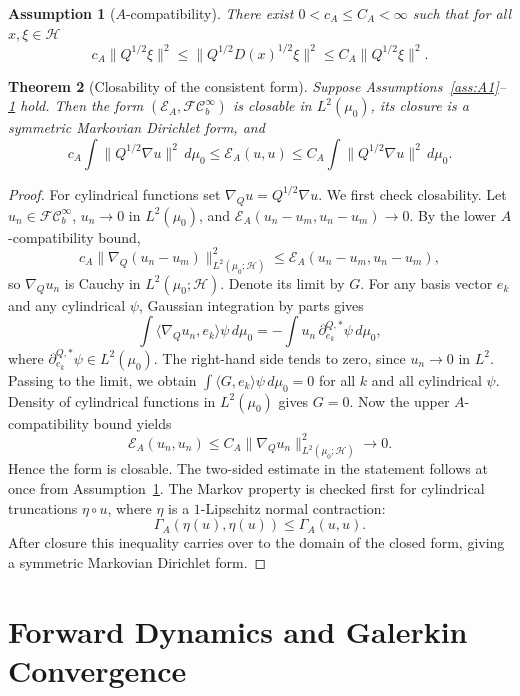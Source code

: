 \documentclass{article}
\newtheorem{theorem}{Theorem}[section]
\newtheorem{assumption}[theorem]{Assumption}
\newcommand{\Hh}{\mathcal H}
\newcommand{\FC}{\mathcal{FC}_b^\infty}
\begin{document}
\begin{assumption}[\(A\)-compatibility]
\label{ass:Acompat}
There exist \(0<c_A\le C_A<\infty\) such that for all \(x,\xi\in\Hh\)
\[
        c_A\|Q^{1/2}\xi\|^2
        \le
        \|Q^{1/2}D(x)^{1/2}\xi\|^2
        \le
        C_A\|Q^{1/2}\xi\|^2 .
\]
\end{assumption}

\begin{theorem}[Closability of the consistent form]
\label{thm:closability}
Suppose Assumptions~\ref{ass:A1}--\ref{ass:Acompat} hold. Then the form
\((\mathcal E_A,\FC)\) is closable in \(L^2(\mu_0)\), its closure is a
symmetric Markovian Dirichlet form, and
\[
        c_A\int\|Q^{1/2}\nabla u\|^2\,d\mu_0
        \le
        \mathcal E_A(u,u)
        \le
        C_A\int\|Q^{1/2}\nabla u\|^2\,d\mu_0 .
\]
\end{theorem}

\begin{proof}
For cylindrical functions set \(\nabla_Q u=Q^{1/2}\nabla u\). We first check
closability. Let \(u_n\in\FC\), \(u_n\to0\) in \(L^2(\mu_0)\), and
\(\mathcal E_A(u_n-u_m,u_n-u_m)\to0\). By the lower \(A\)-compatibility bound,
\[
        c_A\|\nabla_Q(u_n-u_m)\|_{L^2(\mu_0;\Hh)}^2
        \le \mathcal E_A(u_n-u_m,u_n-u_m),
\]
so \(\nabla_Q u_n\) is Cauchy in \(L^2(\mu_0;\Hh)\). Denote its limit by
\(G\). For any basis vector \(e_k\) and any cylindrical \(\psi\), Gaussian
integration by parts gives
\[
        \int \langle \nabla_Q u_n,e_k\rangle \psi\,d\mu_0
        =-\int u_n\,\partial^{Q,*}_{e_k}\psi\,d\mu_0,
\]
where \(\partial^{Q,*}_{e_k}\psi\in L^2(\mu_0)\). The right-hand side tends to
zero, since \(u_n\to0\) in \(L^2\). Passing to the limit, we obtain
\(\int\langle G,e_k\rangle\psi\,d\mu_0=0\) for all \(k\) and all cylindrical
\(\psi\). Density of cylindrical functions in \(L^2(\mu_0)\) gives \(G=0\).
Now the upper \(A\)-compatibility bound yields
\[
        \mathcal E_A(u_n,u_n)\le C_A\|\nabla_Q u_n\|_{L^2(\mu_0;\Hh)}^2\to0.
\]
Hence the form is closable. The two-sided estimate in the statement follows at
once from Assumption~\ref{ass:Acompat}. The Markov property is checked first
for cylindrical truncations \(\eta\circ u\), where \(\eta\) is a
\(1\)-Lipschitz normal contraction:
\[
        \Gamma_A(\eta(u),\eta(u))\le \Gamma_A(u,u).
\]
After closure this inequality carries over to the domain of the closed form,
giving a symmetric Markovian Dirichlet form.
\end{proof}

\section{Forward Dynamics and Galerkin Convergence}
\end{document}
